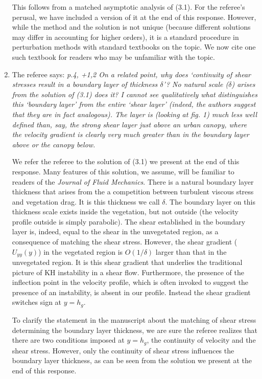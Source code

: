 \documentclass[letterpaper,10pt]{article}
\begin{document}
\begin{enumerate}
This follows from a matched asymptotic analysis of (3.1). For the referee's perusal, we have included a version of it at the end of this response. However, while the method and the solution is not unique (because different solutions may differ in accounting for higher orders), it is a standard procedure in perturbation methods with standard textbooks on the topic. We now cite one such textbook \citep{Hinch1991} for readers who may be unfamiliar with the topic.


\item The referee says:
\textit{
p.4, +1,2 On a related point, why does ‘continuity of shear stresses result in a boundary layer of thickness $\delta$’? No natural scale ($\delta$) arises from the solution of (3.1) does it? I cannot see qualitatively what distinguishes this `boundary layer' from the entire `shear layer' (indeed, the authors suggest that they are in fact analogous). The layer is (looking at fig. 1) much less well defined than, say, the strong shear layer just above an urban canopy, where the velocity gradient is clearly very much greater than in the boundary layer above or the canopy below.
}

We refer the referee to the solution of (3.1) we present at the end of this response.
Many features of this solution, we assume, will be familiar to readers of the \textit{Journal of Fluid Mechanics}.
There is a natural boundary layer thickness that arises from the a competition between turbulent viscous stress and vegetation drag.
It is this thickness we call $\delta$.
The boundary layer on this thickness scale exists inside the vegetation, but not outside (the velocity profile outside is simply parabolic). 
The shear established in the boundary layer is, indeed, equal to the shear in the unvegetated region, as a consequence of matching the shear stress.
However, the shear gradient ($U_{yy}(y)$) in the vegetated region is $O(1/\delta)$ larger than that in the unvegetated region.
It is this shear gradient that underlies the traditional picture of KH instability in a shear flow.
Furthermore, the presence of the inflection point in the velocity profile, which is often invoked to suggest the presence of an instability, is absent in our profile.
Instead the shear gradient switches sign at $y=h_g$.

To clarify the statement in the manuscript about the matching of shear stress determining the boundary layer thickness, we are sure the referee realizes that there are two conditions imposed at $y=h_g$, the continuity of velocity and the shear stress.
However, only the continuity of shear stress influences the boundary layer thickness, as can be seen from the solution we present at the end of this response. 



\end{enumerate}
\end{document}
